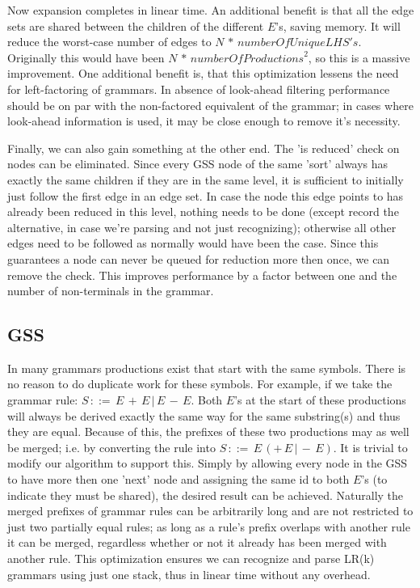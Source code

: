 \documentclass[a4paper,10pt]{article}
\begin{document}
Now expansion completes in linear time. An additional benefit is that all the edge sets are shared between the children of the different $E$'s, saving memory. It will reduce the worst-case number of edges to $N\,*\,\mathit{numberOfUniqueLHS's}$. Originally this would have been $N\,*\,\mathit{numberOfProductions}^2$, so this is a massive improvement. One additional benefit is, that this optimization lessens the need for left-factoring of grammars. In absence of look-ahead filtering performance should be on par with the non-factored equivalent of the grammar; in cases where look-ahead information is used, it may be close enough to remove it's necessity.

Finally, we can also gain something at the other end. The 'is reduced' check on nodes can be eliminated. Since every GSS node of the same 'sort' always has exactly the same children if they are in the same level, it is sufficient to initially just follow the first edge in an edge set. In case the node this edge points to has already been reduced in this level, nothing needs to be done (except record the alternative, in case we're parsing and not just recognizing); otherwise all other edges need to be followed as normally would have been the case. Since this guarantees a node can never be queued for reduction more then once, we can remove the check. This improves performance by a factor between one and the number of non-terminals in the grammar.

\subsection{GSS}

In many grammars productions exist that start with the same symbols. There is no reason to do duplicate work for these symbols. For example, if we take the grammar rule: $S\,::=\,E\,+\,E\,|\,E\,-\,E$. Both $E$'s at the start of these productions will always be derived exactly the same way for the same substring(s) and thus they are equal. Because of this, the prefixes of these two productions may as well be merged; i.e. by converting the rule into $S\,::=\,E\,(+\,E\,|\,-\,E)$. It is trivial to modify our algorithm to support this. Simply by allowing every node in the GSS to have more then one 'next' node and assigning the same id to both $E$'s (to indicate they must be shared), the desired result can be achieved. Naturally the merged prefixes of grammar rules can be arbitrarily long and are not restricted to just two partially equal rules; as long as a rule's prefix overlaps with another rule it can be merged, regardless whether or not it already has been merged with another rule. This optimization ensures we can recognize and parse LR(k) grammars using just one stack, thus in linear time without any overhead.
\end{document}
